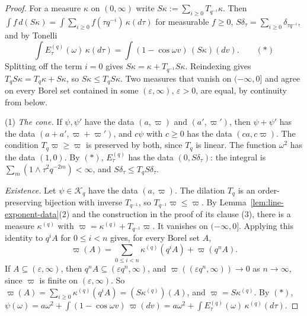 \begin{proof}
\leanok
{}
For a measure $\kappa$ on $(0,\infty)$ write $S\kappa := \sum_{i \ge 0}T_{q^{-i}}\kappa$. Then
$\int f\,d(S\kappa) = \int\sum_{i \ge 0}f(\tau q^{-i})\,\kappa(d\tau)$ for measurable $f \ge 0$,
$S\delta_\tau = \sum_{i \ge 0}\delta_{\tau q^{-i}}$, and by Tonelli
\[
  \int E^{(q)}_\tau(\omega)\,\kappa(d\tau) = \int(1 - \cos\omega v)\,(S\kappa)(dv). \qquad (*)
\]
Splitting off the term $i = 0$ gives $S\kappa = \kappa + T_{q^{-1}}S\kappa$. Reindexing gives
$T_qS\kappa = T_q\kappa + S\kappa$, so $S\kappa \le T_qS\kappa$. Two measures that vanish on
$(-\infty,0]$ and agree on every Borel set contained in some $(\varepsilon,\infty)$,
$\varepsilon > 0$, are equal, by continuity from below.

(1) \emph{The cone.} If $\psi, \psi'$ have the data $(a,\varpi)$ and $(a',\varpi')$, then
$\psi + \psi'$ has the data $(a + a', \varpi + \varpi')$, and $c\psi$ with $c \ge 0$ has the data
$(ca, c\varpi)$. The condition $T_q\varpi \ge \varpi$ is preserved by both, since $T_q$ is linear.
The function $\omega^2$ has the data $(1, 0)$. By $(*)$, $E^{(q)}_\tau$ has the data
$(0, S\delta_\tau)$: the \Levy{} integral is $\sum_m(1 \wedge \tau^2q^{-2m}) < \infty$, and
$S\delta_\tau \le T_qS\delta_\tau$.

\emph{Existence.} Let $\psi \in \mathcal{K}_q$ have the data $(a, \varpi)$. The dilation $T_q$ is an
order-preserving bijection with inverse $T_{q^{-1}}$, so $T_{q^{-1}}\varpi \le \varpi$. By
Lemma~\ref{lem:line-exponent-data}(2) and the construction in the proof of its clause (3), there is
a measure $\kappa^{(q)}$ with $\varpi = \kappa^{(q)} + T_{q^{-1}}\varpi$. It vanishes on
$(-\infty,0]$. Applying this identity to $q^iA$ for $0 \le i < n$ gives, for every Borel set $A$,
\[
  \varpi(A) = \sum_{0 \le i < n}\kappa^{(q)}(q^iA) + \varpi(q^nA).
\]
If $A \subseteq (\varepsilon,\infty)$, then $q^nA \subseteq (\varepsilon q^n,\infty)$, and
$\varpi((\varepsilon q^n,\infty)) \to 0$ as $n \to \infty$, since $\varpi$ is finite on
$(\varepsilon,\infty)$. So $\varpi(A) = \sum_{i \ge 0}\kappa^{(q)}(q^iA) = (S\kappa^{(q)})(A)$, and
$\varpi = S\kappa^{(q)}$. By $(*)$,
$\psi(\omega) = a\omega^2 + \int(1 - \cos\omega v)\,\varpi(dv)
= a\omega^2 + \int E^{(q)}_\tau(\omega)\,\kappa^{(q)}(d\tau)$.


\end{proof}
